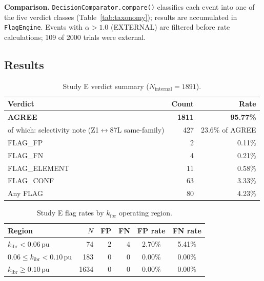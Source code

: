 \documentclass[11pt,a4paper]{article}
\newcommand{\kibr}{k_\mathrm{ibr}}
\begin{document}
\noindent\textbf{Comparison.}
\texttt{DecisionComparator.compare()} classifies each event into one of the
five verdict classes (Table~\ref{tab:taxonomy}); results are accumulated in
\texttt{FlagEngine}.  Events with $\alpha > 1.0$ (EXTERNAL) are filtered
before rate calculations; 109 of 2000 trials were external.

\subsection{Results}
\label{sec:results}

\begin{table}[htbp]
  \centering
  \caption{Study E verdict summary ($N_\mathrm{internal}=1891$).}
  \label{tab:studyE}
  \begin{tabular}{@{}lrr@{}}
    \toprule
    Verdict & Count & Rate \\
    \midrule
    \textbf{AGREE}              & \textbf{1811} & \textbf{95.77\%} \\
    \quad of which: selectivity note (Z1$\leftrightarrow$87L same-family)
                                & 427  & 23.6\% of AGREE \\
    \addlinespace
    FLAG\_FP                    & 2    & 0.11\% \\
    FLAG\_FN                    & 4    & 0.21\% \\
    FLAG\_ELEMENT               & 11   & 0.58\% \\
    FLAG\_CONF                  & 63   & 3.33\% \\
    \midrule
    Any FLAG                    & 80   & 4.23\% \\
    \bottomrule
  \end{tabular}
\end{table}

\begin{table}[htbp]
  \centering
  \caption{Study E flag rates by $\kibr$ operating region.}
  \label{tab:byregion}
  \begin{tabular}{@{}lrrrcc@{}}
    \toprule
    Region & $N$ & FP & FN & FP rate & FN rate \\
    \midrule
    $\kibr < 0.06$\,pu      & 74   & 2 & 4 & 2.70\% & 5.41\% \\
    $0.06 \leq \kibr < 0.10$\,pu & 183 & 0 & 0 & 0.00\% & 0.00\% \\
    $\kibr \geq 0.10$\,pu   & 1634 & 0 & 0 & 0.00\% & 0.00\% \\
    \bottomrule
  \end{tabular}
\end{table}
\end{document}

